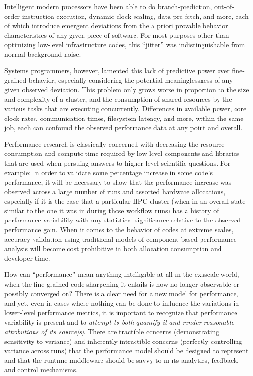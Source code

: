 Intelligent modern processors have been able to do branch-prediction,
out-of-order instruction execution, dynamic clock scaling, data
pre-fetch, and more, each of which introduce emergent deviations from
the a priori provable behavior characteristics of any given piece of
software. For most purposes other than optimizing low-level
infrastructure codes, this ``jitter'' was indistinguishable from
normal background noise.

Systems programmers, however, lamented this lack of predictive power
over fine-grained behavior, especially considering the potential
meaninglessness of any given observed
deviation.   This
problem only grows worse in proportion to the size and complexity of
a cluster, and the consumption of shared resources by the various tasks
that are executing concurrently.  Differences in available power, core
clock rates, communication times, filesystem latency, and more, within
the same job, each can confound the observed performance data at any
point and overall.

Performance research is classically concerned with decreasing the
resource consumption and compute time required by low-level components
and libraries that are used when persuing answers to higher-level
scientific questions. For example: In order to validate some
percentage increase in some code's performance, it will be necessary
to show that the performance increase was observed across a large
number of runs and assorted hardware allocations, especially if it is
the case that a particular HPC cluster (when in an overall state
similar to the one it was in during those workflow runs) has a history
of performance variability with any statistical significance relative
to the observed performance gain. When it comes to the behavior of
codes at extreme scales, accuracy validation using traditional models
of component-based performance analysis will become cost prohibitive
in both allocation consumption and developer time.

How can ``performance'' mean anything intelligible at all in the
exascale world, when the fine-grained code-sharpening it entails is
now no longer observable or possibly converged on?  There is a clear
need for a new model for performance, and yet, even in cases where
nothing can be done to influence the variations in lower-level
performance metrics, it is important to recognize that performance
variability is present and to \textit{attempt to both quantify it and
render reasonable attributions of its source[s]}. There are tractible
concerns (demonstrating sensitivity to variance) and inherently
intractible concerns (perfectly controlling variance across runs) that
the performance model should be designed to represent and that the
runtime middleware should be savvy to in its analytics, feedback, and
control mechanisms.

